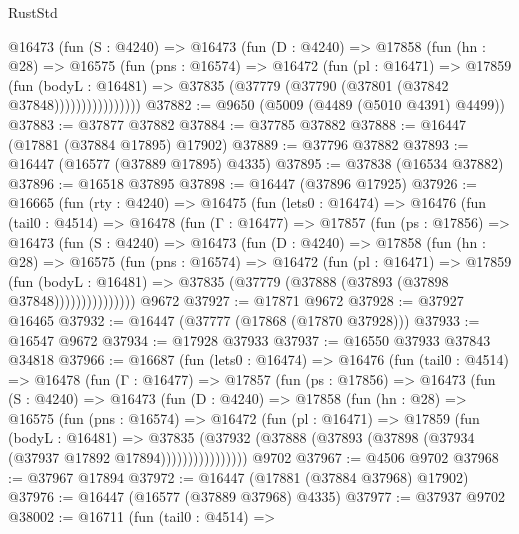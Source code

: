 \begin{lexlean}{RustStd}
\begin{coremodule}
{\begin{coremodule}
{{{{{{{{{{{{{{{{{{{{{{{{{{{{{{{{{{{{{{{{{{{{{{{{{{{{{{{              @16473
                (fun (S : @4240) =>
                @16473
                  (fun (D : @4240) =>
                  @17858
                    (fun (hn : @28) =>
                    @16575
                      (fun (pns : @16574) =>
                      @16472
                        (fun (pl : @16471) =>
                        @17859
                          (fun (bodyL : @16481) =>
                          @37835 (@37779 (@37790 (@37801 (@37842 @37848))))))))))))))))
@37882 := @9650 (@5009 (@4489 (@5010 @4391) @4499))
@37883 := @37877 @37882
@37884 := @37785 @37882
@37888 := @16447 (@17881 (@37884 @17895) @17902)
@37889 := @37796 @37882
@37893 := @16447 (@16577 (@37889 @17895) @4335)
@37895 := @37838 (@16534 @37882)
@37896 := @16518 @37895
@37898 := @16447 (@37896 @17925)
@37926 := @16665
    (fun (rty : @4240) =>
    @16475
      (fun (lets0 : @16474) =>
      @16476
        (fun (tail0 : @4514) =>
        @16478
          (fun (Γ : @16477) =>
          @17857
            (fun (ps : @17856) =>
            @16473
              (fun (S : @4240) =>
              @16473
                (fun (D : @4240) =>
                @17858
                  (fun (hn : @28) =>
                  @16575
                    (fun (pns : @16574) =>
                    @16472
                      (fun (pl : @16471) =>
                      @17859
                        (fun (bodyL : @16481) =>
                        @37835 (@37779 (@37888 (@37893 (@37898 @37848)))))))))))))))
    @9672
@37927 := @17871 @9672
@37928 := @37927 @16465
@37932 := @16447 (@37777 (@17868 (@17870 @37928)))
@37933 := @16547 @9672
@37934 := @17928 @37933
@37937 := @16550 @37933 @37843 @34818
@37966 := @16687
    (fun (lets0 : @16474) =>
    @16476
      (fun (tail0 : @4514) =>
      @16478
        (fun (Γ : @16477) =>
        @17857
          (fun (ps : @17856) =>
          @16473
            (fun (S : @4240) =>
            @16473
              (fun (D : @4240) =>
              @17858
                (fun (hn : @28) =>
                @16575
                  (fun (pns : @16574) =>
                  @16472
                    (fun (pl : @16471) =>
                    @17859
                      (fun (bodyL : @16481) =>
                      @37835
                        (@37932
                          (@37888 (@37893 (@37898 (@37934 (@37937 @17892 @17894))))))))))))))))
    @9702
@37967 := @4506 @9702
@37968 := @37967 @17894
@37972 := @16447 (@17881 (@37884 @37968) @17902)
@37976 := @16447 (@16577 (@37889 @37968) @4335)
@37977 := @37937 @9702
@38002 := @16711
    (fun (tail0 : @4514) =>
}}}}}}}}}}}}}}}}}}}}}}}}}}}}}}}}}}}}}}}}}}}}}}}}}}}}}}}
\end{coremodule}}
\end{coremodule}
\end{lexlean}

